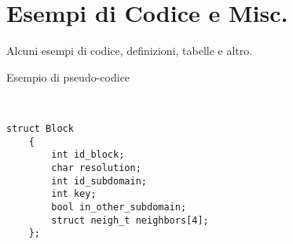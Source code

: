 \section{Esempi di Codice e Misc.}\label{sec:code}
Alcuni esempi di codice, definizioni, tabelle e altro.

\begin{algorithm}[ht]
	\caption{Esempio di pseudo-codice}
	\label{alg:Prim_Mst}
	\begin{algorithmic}[1]
		\Statex
		\\
		\EndFor
		\EndIf
		\EndFor
		\EndWhile
		\State \Return{}
		\EndFunction
	\end{algorithmic}
\end{algorithm}


\begin{lstlisting}[caption={Esempio di definizione struttura dati C++, ma non algoritmo},
	label={lst:block_struct}]
	struct Block
	{
		int id_block;
		char resolution;
		int id_subdomain;
		int key;
		bool in_other_subdomain;
		struct neigh_t neighbors[4];
	};
\end{lstlisting}



